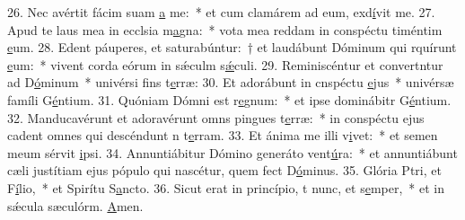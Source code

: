 26. Nec avértit fácim suam \uline{a} me:~* et cum clamárem ad eum, exd\uline{í}vit me.
27. Apud te laus mea in ecclsia m\uline{a}gna:~* vota mea reddam in conspéctu timéntim \uline{e}um.
28. Edent páuperes, et saturabúntur:~† et laudábunt Dóminum qui rquírunt \uline{e}um:~* vivent corda eórum in sǽculm s\uline{ǽ}culi.
29. Reminiscéntur et convertntur ad D\uline{ó}minum~* univérsi fins t\uline{e}rræ:
30. Et adorábunt in cnspéctu \uline{e}jus~* univérsæ famíli G\uline{é}ntium.
31. Quóniam Dómni est r\uline{e}gnum:~* et ipse dominábitr G\uline{é}ntium.
32. Manducavérunt et adoravérunt omns pingues t\uline{e}rræ:~* in conspéctu ejus cadent omnes qui descéndunt n t\uline{e}rram.
33. Et ánima me illi v\uline{i}vet:~* et semen meum sérvit \uline{i}psi.
34. Annuntiábitur Dómino generáto vent\uline{ú}ra:~* et annuntiábunt cæli justítiam ejus pópulo qui nascétur, quem fect D\uline{ó}minus.
35. Glória Ptri, et F\uline{í}lio,~* et Spirítu S\uline{a}ncto.
36. Sicut erat in princípio, t nunc, et s\uline{e}mper,~* et in sǽcula sæculórm. \uline{A}men.
